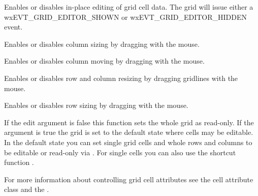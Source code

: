 
Enables or disables in-place editing of grid cell data. The grid will issue either a
wxEVT\_GRID\_EDITOR\_SHOWN or wxEVT\_GRID\_EDITOR\_HIDDEN event.



\label{wxgridenabledragcolsize}


Enables or disables column sizing by dragging with the mouse.



\label{wxgridenabledragcolmove}


Enables or disables column moving by dragging with the mouse.



\label{wxgridenabledraggridsize}


Enables or disables row and column resizing by dragging gridlines with the mouse.



\label{wxgridenabledragrowsize}


Enables or disables row sizing by dragging with the mouse.



\label{wxgridenableediting}


If the edit argument is false this function sets the whole grid as read-only. If the
argument is true the grid is set to the default state where cells may be editable. In the
default state you can set single grid cells and whole rows and columns to be editable or
read-only via
. For single
cells you can also use the shortcut function
.

For more information about controlling grid cell attributes see the
 cell attribute class and the
.



